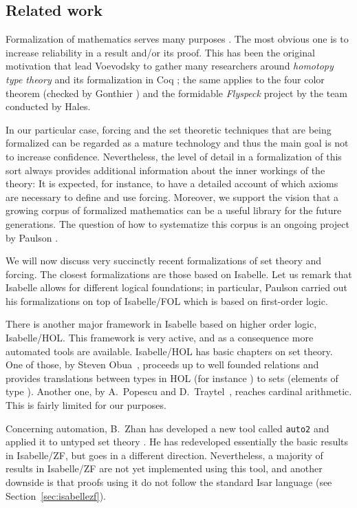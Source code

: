 \subsection{Related work}\label{sec:related-work}
Formalization of mathematics serves many purposes
\cite{simpson-theorem-proving-math}. The most obvious one is to
increase reliability in a result and/or its proof. This has been the
original motivation that lead Voevodsky to gather many researchers
around \emph{homotopy type theory} and its formalization in Coq
\cite{hottbook}; the same applies to the four color theorem (checked
by Gonthier \cite{MR2463991}) and the formidable \emph{Flyspeck}
project \cite{MR3659768} by the team conducted by Hales.

In our particular case, forcing and the set theoretic techniques that
are being formalized can be regarded as a mature technology and thus
the main goal is not to increase confidence. Nevertheless, the level
of detail in a formalization of this sort always provides additional
information about the inner workings of the theory: It is expected, for
instance, to have a detailed account of which axioms are necessary to
define and use forcing. Moreover, we support the vision that a growing
corpus of formalized mathematics can be a useful library for the
future generations. The question of how to systematize this corpus is
an ongoing project by Paulson \cite{ALEXANDRIA}.

We will now discuss very succinctly recent formalizations of
set theory and forcing. The closest formalizations are those based on
Isabelle. Let us remark that Isabelle allows for different logical
foundations; in particular, Paulson carried out his formalizations
on top of Isabelle/FOL which is based on first-order logic.

There is another major framework in Isabelle based on higher order
logic, Isabelle/HOL. This framework is very active, and as a
consequence more automated tools are available. Isabelle/HOL has basic
chapters on set theory. One of those, by Steven
Obua~\cite{DBLP:conf/ictac/Obua06}, proceeds up to well founded
relations and provides translations between types in HOL (for instance
) to sets (elements of type ). Another one, by
A.~Popescu and D.~Traytel~\cite{DBLP:conf/itp/Blanchette0T14}, reaches
cardinal arithmetic. This is fairly limited for our purposes.

Concerning automation, B.~Zhan has developed a new tool called
\texttt{auto2} and applied it to untyped set theory
\cite{10.1007/978-3-319-66107-0_32}. He has redeveloped essentially
the basic results in Isabelle/ZF, but goes in a different
direction. Nevertheless, a majority of results in
Isabelle/ZF are not yet implemented using this tool, and  another
downside is that proofs using it do not follow the standard Isar
language (see Section~\ref{sec:isabellezf}).

